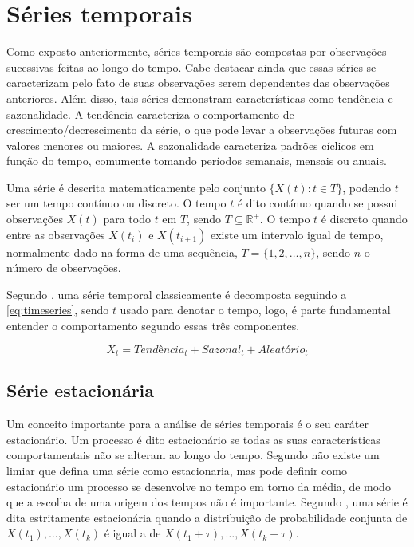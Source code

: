 \documentclass[
    12pt,
    oneside,
    a4paper,
    english,
    brazil
]{abntex2}
\begin{document}
\section{Séries temporais}\label{sec:seriesTemporais}

Como  exposto anteriormente,  séries  temporais são  compostas por  observações
sucessivas  feitas ao  longo do  tempo. Cabe  destacar ainda  que essas  séries
se  caracterizam   pelo  fato  de   suas  observações  serem   dependentes  das
observações  anteriores. Além  disso,  tais  séries demonstram  características
como  tendência e  sazonalidade.  A tendência  caracteriza  o comportamento  de
crescimento/decrescimento da série, o que  pode levar a observações futuras com
valores  menores ou  maiores. A  sazonalidade caracteriza  padrões cíclicos  em
função do tempo, comumente tomando períodos semanais, mensais ou anuais.

Uma série é descrita matematicamente pelo conjunto $\{X(t): t \in T\}$, podendo
$t$ ser  um tempo  contínuo ou  discreto. O  tempo $t$  é dito  contínuo quando
se  possui  observações  $X(t)$  para  todo $t$  em  $T$,  sendo  $T  \subseteq
\mathbb{R}^{+}$. O tempo $t$ é discreto  quando entre as observações $X(t_i)$ e
$X(t_{i+1})$ existe um  intervalo igual de tempo, normalmente dado  na forma de
uma sequência, $T = \{1, 2, \ldots, n\}$, sendo $n$ o número de observações.

Segundo  , uma  série  temporal  classicamente é  decomposta
seguindo a \autoref{eq:timeseries}, sendo $t$ usado para denotar o tempo, logo,
é parte fundamental entender o comportamento segundo essas três componentes.

\begin{equation}
    \label{eq:timeseries}
    X_t = Tendência_t + Sazonal_t + Aleatório_t
\end{equation}

\subsection{Série estacionária}\label{sec:estacionaria}

Um  conceito   importante  para  a  análise   de  séries  temporais  é   o  seu
caráter  estacionário.  Um  processo  é  dito estacionário  se  todas  as  suas
características  comportamentais não  se  alteram ao  longo  do tempo.  Segundo
 não existe  um limiar que defina  uma série como
estacionaria, mas pode  definir como estacionário um processo  se desenvolve no
tempo em  torno da média, de  modo que a escolha  de uma origem dos  tempos não
é  importante.  Segundo  ,  uma série  é  dita  estritamente
estacionária  quando  a  distribuição  de probabilidade  conjunta  de  $X(t_1),
\ldots, X(t_k)$ é igual a de $X(t_1 + \tau), \ldots, X(t_k + \tau)$.
\end{document}
